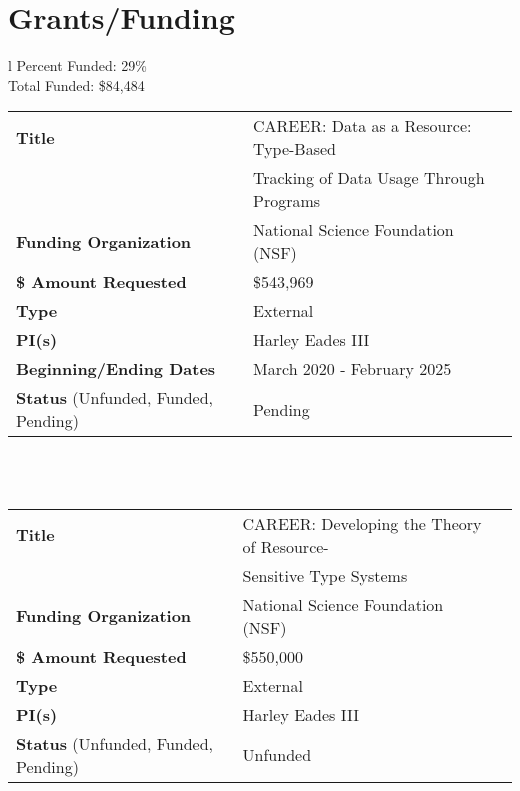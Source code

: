 \documentclass[11pt]{article}
\begin{document}
    \section{Grants/Funding}
    \label{subsec:funding_(awarded_grants)}
    \vspace{-10px}
    \begin{tabular}{l}
      Percent Funded: 29\%\\ %
      Total Funded: \$84,484\\
      \begin{tabular}{|l|l|l|}
          \hline
          \textbf{Title} & CAREER: Data as a Resource: Type-Based \,\,\,\,\,\,\\
                         & Tracking of Data Usage Through Programs\\
          \hline
          \textbf{Funding Organization} & National Science Foundation (NSF)\\
          \hline
          \textbf{\$ Amount Requested} & \$543,969\\
          \hline
          \textbf{Type} & External\\
          \hline
          \textbf{PI(s)} & Harley Eades III\\
          \hline
          \textbf{Beginning/Ending Dates} & March 2020 - February 2025\\
          \hline
          \textbf{Status} (Unfunded, Funded, Pending) & Pending\\
          \hline
      \end{tabular}\\
      \\
      \begin{tabular}{|l|l|l|}
          \hline
          \textbf{Title} & CAREER: Developing the Theory of Resource-\\
                         & Sensitive Type Systems \\
          \hline
          \textbf{Funding Organization} & National Science Foundation (NSF)\\
          \hline
          \textbf{\$ Amount Requested} & \$550,000\\
          \hline
          \textbf{Type} & External\\
          \hline
          \textbf{PI(s)} & Harley Eades III\\
          \hline
          \textbf{Status} (Unfunded, Funded, Pending) & Unfunded\\
          \hline
        \end{tabular}\\

\end{tabular}
\end{document}
